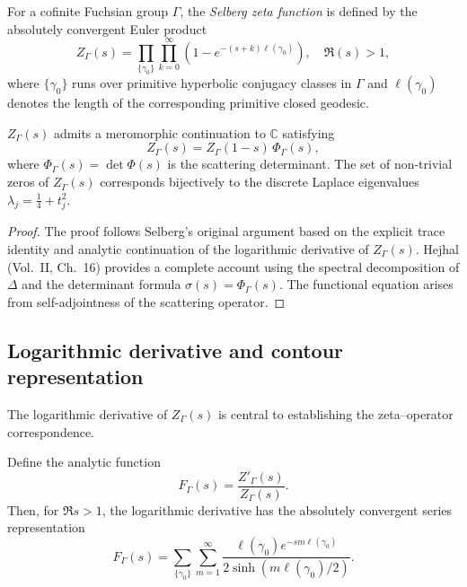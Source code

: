 \begin{definition}
\label{def:selberg-zeta}
For a cofinite Fuchsian group $\Gamma$, the \emph{Selberg zeta function} is defined by the absolutely convergent Euler product
\[
Z_\Gamma(s)
= \prod_{\{\gamma_0\}}
\prod_{k=0}^{\infty}
\left(1-e^{-(s+k)\ell(\gamma_0)}\right),
\quad \Re(s)>1,
\]
where $\{\gamma_0\}$ runs over primitive hyperbolic conjugacy classes in $\Gamma$ and $\ell(\gamma_0)$ denotes the length of the corresponding primitive closed geodesic.
\end{definition}

\begin{theorem}
\label{thm:zeta-analytic}
$Z_\Gamma(s)$ admits a meromorphic continuation to $\mathbb{C}$ satisfying
\[
Z_\Gamma(s) = Z_\Gamma(1-s)\, \Phi_\Gamma(s),
\]
where $\Phi_\Gamma(s)=\det\Phi(s)$ is the scattering determinant.  
The set of non-trivial zeros of $Z_\Gamma(s)$ corresponds bijectively to the discrete Laplace eigenvalues $\lambda_j = \tfrac{1}{4}+t_j^2$.
\end{theorem}

\begin{proof}\relax
The proof follows Selberg’s original argument based on the explicit trace identity and analytic continuation of the logarithmic derivative of $Z_\Gamma(s)$.  
Hejhal (Vol.~II, Ch.~16) provides a complete account using the spectral decomposition of $\Delta$ and the determinant formula $\sigma(s)=\Phi_\Gamma(s)$.  
The functional equation arises from self-adjointness of the scattering operator.
\end{proof}

\subsection{Logarithmic derivative and contour representation}
\label{subsec:ch4-part4-log-derivative}
\relax

The logarithmic derivative of $Z_\Gamma(s)$ is central to establishing the zeta–operator correspondence.

\begin{definition}
\label{def:zeta-derivative}
Define the analytic function
\[
F_\Gamma(s) = \frac{Z'_\Gamma(s)}{Z_\Gamma(s)}.
\]
Then, for $\Re s>1$, the logarithmic derivative has the absolutely convergent series representation
\[
F_\Gamma(s) = \sum_{\{\gamma_0\}}\sum_{m=1}^{\infty}
\frac{\ell(\gamma_0)e^{-sm\ell(\gamma_0)}}{2\sinh(m\ell(\gamma_0)/2)}.
\]
\end{definition}

